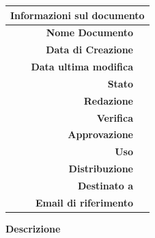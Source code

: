 \begin{center}
\begin{center}
\begin{tabular}{r|l}
	\multicolumn{2}{c}{\textbf{Informazioni sul documento} } \\ \hline
	\textbf{Nome Documento} & \nomedocumentofisico \\
	\textbf{Data di Creazione} & \datacreazione \\
	\textbf{Data ultima modifica} & \datamodifica \\
	\textbf{Stato} & \stato \\
	\textbf{Redazione} & \redazione \\
	\textbf{Verifica} & \verifica \\
	\textbf{Approvazione} & \approvazione \\
	\textbf{Uso} & \uso \\
	\textbf{Distribuzione} & \gruppo \\
	\textbf{Destinato a} & \destinateTo \\
	\textbf{Email di riferimento} & \email
\end{tabular}
\end{center}

\normalsize

\vspace{1cm}
\textbf{Descrizione} \\


\vfill

\end{center}

\clearpage